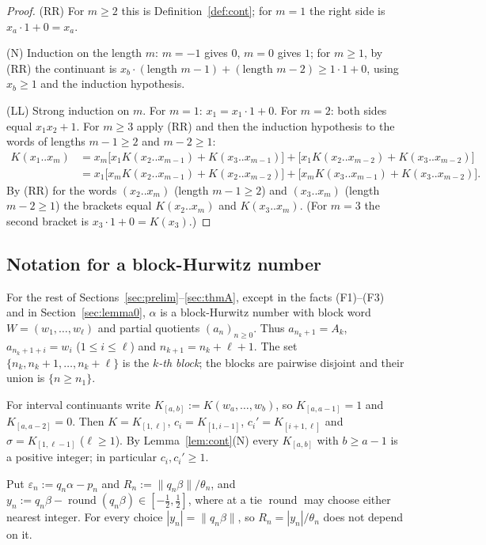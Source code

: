 \documentclass[11pt]{amsart}
\theoremstyle{definition}
\theoremstyle{remark}
\newcommand{\dist}[1]{\lVert #1\rVert}
\newcommand{\rnd}{\operatorname{round}}
\begin{document}
\begin{proof}
(RR) For $m\ge2$ this is Definition~\ref{def:cont}; for $m=1$ the right side is $x_a\cdot1+0=x_a$.

(N) Induction on the length $m$: $m=-1$ gives $0$, $m=0$ gives $1$; for $m\ge1$, by (RR) the continuant is
$x_b\cdot(\text{length }m-1)+(\text{length }m-2)\ge1\cdot1+0$, using $x_b\ge1$ and the induction hypothesis.

(LL) Strong induction on $m$. For $m=1$: $x_1=x_1\cdot1+0$. For $m=2$: both sides equal $x_1x_2+1$. For
$m\ge3$ apply (RR) and then the induction hypothesis to the words of lengths $m-1\ge2$ and $m-2\ge1$:
\begin{align*}
K(x_1..x_m)&=x_m\bigl[x_1K(x_2..x_{m-1})+K(x_3..x_{m-1})\bigr]+\bigl[x_1K(x_2..x_{m-2})+K(x_3..x_{m-2})\bigr]\\
&=x_1\bigl[x_mK(x_2..x_{m-1})+K(x_2..x_{m-2})\bigr]+\bigl[x_mK(x_3..x_{m-1})+K(x_3..x_{m-2})\bigr].
\end{align*}
By (RR) for the words $(x_2..x_m)$ (length $m-1\ge2$) and $(x_3..x_m)$ (length $m-2\ge1$) the brackets equal
$K(x_2..x_m)$ and $K(x_3..x_m)$. (For $m=3$ the second bracket is $x_3\cdot1+0=K(x_3)$.)
\end{proof}

\subsection{Notation for a block-Hurwitz number}\label{subsec:notation}
For the rest of Sections~\ref{sec:prelim}--\ref{sec:thmA}, except in the facts (F1)--(F3) and in
Section~\ref{sec:lemma0}, $\alpha$ is a block-Hurwitz number with block word $W=(w_1,\dots,w_\ell)$ and
partial quotients $(a_n)_{n\ge0}$. Thus $a_{n_k+1}=A_k$, $a_{n_k+1+i}=w_i$ ($1\le i\le\ell$) and
$n_{k+1}=n_k+\ell+1$. The set $\{n_k,n_k+1,\dots,n_k+\ell\}$ is the \emph{$k$-th block}; the blocks are pairwise
disjoint and their union is $\{n\ge n_1\}$.

For interval continuants write $K_{[a,b]}:=K(w_a,\dots,w_b)$, so $K_{[a,a-1]}=1$ and $K_{[a,a-2]}=0$. Then
$K=K_{[1,\ell]}$, $c_i=K_{[1,i-1]}$, $c_i'=K_{[i+1,\ell]}$ and $\sigma=K_{[1,\ell-1]}$ ($\ell\ge1$). By
Lemma~\ref{lem:cont}(N) every $K_{[a,b]}$ with $b\ge a-1$ is a positive integer; in particular $c_i,c_i'\ge1$.

Put $\varepsilon_n:=q_n\alpha-p_n$ and $R_n:=\dist{q_n\beta}/\theta_n$, and
$y_n:=q_n\beta-\rnd(q_n\beta)\in[-\tfrac12,\tfrac12]$, where at a tie $\rnd$ may choose either nearest
integer. For every choice $|y_n|=\dist{q_n\beta}$, so $R_n=|y_n|/\theta_n$ does not depend on it.
\end{document}
